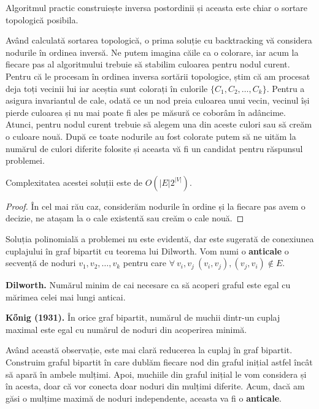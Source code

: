 Algoritmul practic construiește inversa postordinii și aceasta este chiar o sortare topologică posibila.

Având calculată sortarea topologică, o prima soluție cu backtracking vă considera nodurile în ordinea inversă.
Ne putem imagina căile ca o colorare, iar acum la fiecare pas al algoritmului trebuie să stabilim culoarea pentru
nodul curent. Pentru că le procesam în ordinea inversa sortării topologice, știm că am procesat deja toți vecinii lui
iar aceștia sunt colorați în culorile $\{C_{1}, C_{2}, \ldots, C_{k}\}$. Pentru a asigura invariantul de cale, odată ce
un nod preia culoarea unui vecin, vecinul își pierde culoarea și nu mai poate fi ales pe măsură ce coborâm în adâncime.
Atunci, pentru nodul curent trebuie să alegem una din aceste culori sau să creăm o culoare nouă. După ce toate nodurile
au fost colorate putem să ne uităm la numărul de culori diferite folosite și aceasta vă fi un candidat pentru răspunsul
problemei.

\begin{lem}
  Complexitatea acestei soluții este de $O(|E|2^{|V|})$.
\end{lem}

\begin{proof}
  În cel mai rău caz, considerăm nodurile în ordine și la fiecare pas avem o decizie, ne atașam la o cale existentă sau creăm o cale
  nouă.
\end{proof}

\noindent Soluția polinomială a problemei nu este evidentă, dar este sugerată de conexiunea cuplajului în graf bipartit cu teorema lui
Dilworth. Vom numi o \textbf{anticale} o secvență de noduri $v_{1}, v_{2}, \ldots, v_{k}$ pentru care
$\forall \ v_{i}, v_{j} \ (v_{i}, v_{j}), (v_{j}, v_{i}) \notin E$.

\begin{thm}
  \label{Dilworth}
  \textbf{Dilworth.} Numărul minim de cai necesare ca să acoperi graful este egal cu mărimea celei mai lungi anticai.
\end{thm}

\begin{thm}
  \label{Konig}
  \textbf{Kőnig (1931).} În orice graf bipartit, numărul de muchii dintr-un cuplaj maximal este egal cu numărul de noduri din acoperirea minimă.
\end{thm}

Având această observație, este mai clară reducerea la cuplaj în graf bipartit. Construim graful bipartit în care dublăm fiecare nod din graful
inițial astfel încât să apară în ambele mulțimi. Apoi, muchiile din graful inițial le vom considera și în acesta, doar că vor conecta doar
noduri din mulțimi diferite. Acum, dacă am găsi o mulțime maximă de noduri independente, aceasta va fi o \textbf{anticale}.

